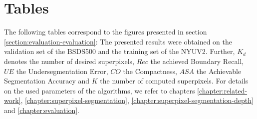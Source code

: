 \newpage
\section{Tables}

The following tables correspond to the figures presented in section \ref{section:evaluation-evaluation}: The presented results were obtained on the validation set of the BSDS500 and the training set of the NYUV2. Further, $K_d$ denotes the number of desired superpixels, $Rec$ the achieved Boundary Recall, $UE$ the Undersegmentation Error, $CO$ the Compactness, $ASA$ the Achievable Segmentation Accuracy and $K$ the number of computed superpixels. For details on the used parameters of the algorithms, we refer to chapters \ref{chapter:related-work}, \ref{chapter:superpixel-segmentation}, \ref{chapter:superpixel-segmentation-depth} and \ref{chapter:evaluation}.

